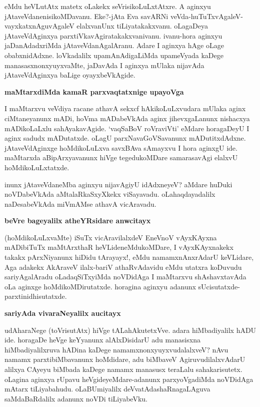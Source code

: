 \noindent
eMdu heVLutAtx matetx oLakekx seVrisikoLuLxtAtxre. A aginxyu 
jAtaveVdanenisikoMDavanu. Eke?-jAta Eva savARNi 
veVda-huTuTxvAgaleV-vayxkatxnAguvAgaleV elalxvanUnx tiLiyatakakxvanu. oLagaDeya jAtaveVdAginxya parxtiVkavAgiratakakxvanivanu. ivanu-hora aginxyu jaDanAdadxriMda jAtaveVdanAgalAranu. Adare I aginxya hAge oLage obabxnidAdxne. loVkadalilx upamAnAdigaLiMda upameVyada kaDege manasasxnonxyuyxvaMte, jaDavAda I aginxya mUlaka nijavAda jAtaveVdAginxya baLige oyayxbeVkAgide.

{\bigskip
\noindent
{\large\bf maMtarxdiMda kamaR parxvaqtatxnige upayoVga}}\label{page117}
\medskip

\noindent
I maMtarxvu veVdiya racane athavA sekxcf hAkikoLuLxvudara mUlaka 
aginx ciMtaneyanunx mADi, hoVma mADabeVkAda aginx jihevxgaLanunx nishacxya mADikoLaLxlu sahAyakavAgide. `vaqSaBoV roVraviVti' eMdare horagaDeyU I aginx sadudx mADutatxde. oLagU parxNavaGoVSavanunx mADutitxdAdxne. jAtaveVdAginxge hoMdikoLuLxva savxBAva sAmayxvu I hora aginxgU ide. maMtarxda aBipArxyavanunx hiVge tegedukoMDare samarasavAgi elalxvU hoMdikoLuLxtatxde.

inunx jAtaveVdaneMba aginxyu nijavAgiyU idAdxneyeV? aMdare 
huDuki noVDabeVkAda aMtalaRkaSxyXkekx viSayavadu. oLahaqdayadalilx naDesabeVkAda miVmAMse athavA vicAravadu.

{\bigskip
\noindent
{\large\bf beVre bageyalilx atheYRsidare anwcitayx}}\label{page117a}
\medskip

\noindent
(hoMdikoLuLxvaMte) iSuTx vicAravilalxdeV EneVnoV vAyxKAyxna mADibiTuTx 
maMtArxthaR heVLideneMdukoMDare, I vAyxKAyxnakekx takakx pArxNiyanunx 
hiDidu tArayayx!, eMdu namamxnAnxrAdarU keVLidare, Aga adakekx 
AkAraveV ilalx-bariV athaRvAdavidu eMdu utatxra koDuvudu 
sariyAgalAradu oLadaqSiTxyiMda noVDidAga I maMtarxvu shAshavxtavAda oLa aginxge hoMdikoMDirutatxde. horagina aginxyu adanunx sUcisutatxde-parxtinidhisutatxde.

{\bigskip
\noindent
{\large\bf sariyAda vivaraNeyalilx aucitayx}}\label{page117b}
\medskip

\noindent
udAharaNege (toVrisutAtx) hiVge tALahAkutetxVve. adara hiMbadiyalilx 
hADU ide. horagaDe heVge keYyanunx alAlxDisidarU adu manasisxna 
hiMbadiyalilxruva \hbox{hADina} kaDege namamxnonxyuyxvudalalxveV? nAvu namamx 
parxtibiMbavanunx hoMdidare, adu biMbaveV AgiruvudilalxvAdarU alilxya CAyeyu biMbada kaDege namamx manasusx teraLalu sahakarisutetx. oLagina aginxya rUpavu heVgideyeMdare-adanunx parxyoVgadiMda noVDidAga mAtarx tiLiyabahudu. oLaBUmiyalilx deVvatAdashaRnagaLAguva saMdaBaRdalilx adanunx noVDi tiLiyabeVku.

